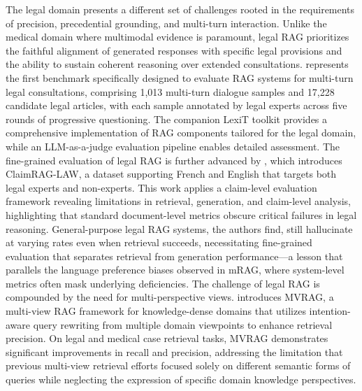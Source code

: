 \documentclass[11pt]{article}
\begin{document}
The legal domain presents a different set of challenges rooted in the requirements of precision, precedential grounding, and multi-turn interaction. Unlike the medical domain where multimodal evidence is paramount, legal RAG prioritizes the faithful alignment of generated responses with specific legal provisions and the ability to sustain coherent reasoning over extended consultations. \cite{ref394} represents the first benchmark specifically designed to evaluate RAG systems for multi-turn legal consultations, comprising 1,013 multi-turn dialogue samples and 17,228 candidate legal articles, with each sample annotated by legal experts across five rounds of progressive questioning. The companion LexiT toolkit provides a comprehensive implementation of RAG components tailored for the legal domain, while an LLM-as-a-judge evaluation pipeline enables detailed assessment. The fine-grained evaluation of legal RAG is further advanced by \cite{ref395}, which introduces ClaimRAG-LAW, a dataset supporting French and English that targets both legal experts and non-experts. This work applies a claim-level evaluation framework revealing limitations in retrieval, generation, and claim-level analysis, highlighting that standard document-level metrics obscure critical failures in legal reasoning. General-purpose legal RAG systems, the authors find, still hallucinate at varying rates even when retrieval succeeds, necessitating fine-grained evaluation that separates retrieval from generation performance---a lesson that parallels the language preference biases observed in mRAG, where system-level metrics often mask underlying deficiencies. The challenge of legal RAG is compounded by the need for multi-perspective views. \cite{ref396} introduces MVRAG, a multi-view RAG framework for knowledge-dense domains that utilizes intention-aware query rewriting from multiple domain viewpoints to enhance retrieval precision. On legal and medical case retrieval tasks, MVRAG demonstrates significant improvements in recall and precision, addressing the limitation that previous multi-view retrieval efforts focused solely on different semantic forms of queries while neglecting the expression of specific domain knowledge perspectives.
\end{document}
